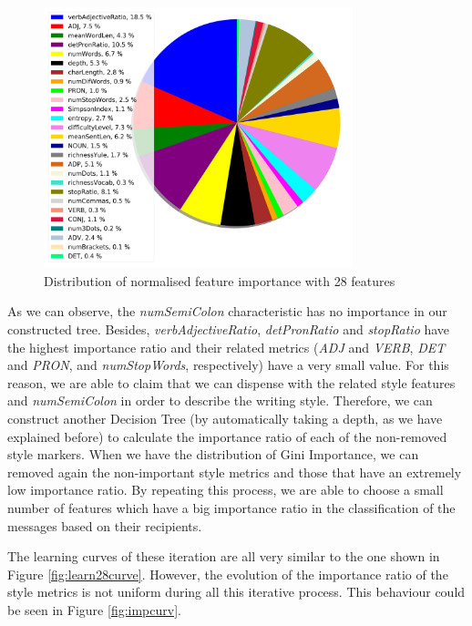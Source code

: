 \begin{figure}
	\centering%
	\centerline{\includegraphics[width=0.8\textwidth]{Imagenes/Bitmap/DecisionTrees/pie28.png}}%
	\caption{Distribution of normalised feature importance with 28 features}%
	\label{fig:nfi28}
\end{figure}

As we can observe, the \textit{numSemiColon} characteristic has no importance in our constructed tree. Besides, \textit{verbAdjectiveRatio}, \textit{detPronRatio} and \textit{stopRatio} have the highest importance ratio and their related metrics (\textit{ADJ} and \textit{VERB}, \textit{DET} and \textit{PRON}, and \textit{numStopWords}, respectively) have a very small value. For this reason, we are able to claim that we can dispense with the related style features and \textit{numSemiColon} in order to describe the writing style. Therefore, we can construct another Decision Tree (by automatically taking a depth, as we have explained before) to calculate the importance ratio of each of the non-removed style markers. When we have the distribution of Gini Importance, we can removed again the non-important style metrics and those that have an extremely low importance ratio. By repeating this process, we are able to choose a small number of features which have a big importance ratio in the classification of the messages based on their recipients.

The learning curves of these iteration are all very similar to the one shown in Figure \ref{fig:learn28curve}. However, the evolution of the importance ratio of the style metrics is not uniform during all this iterative process. This behaviour could be seen in Figure \ref{fig:impcurv}.

